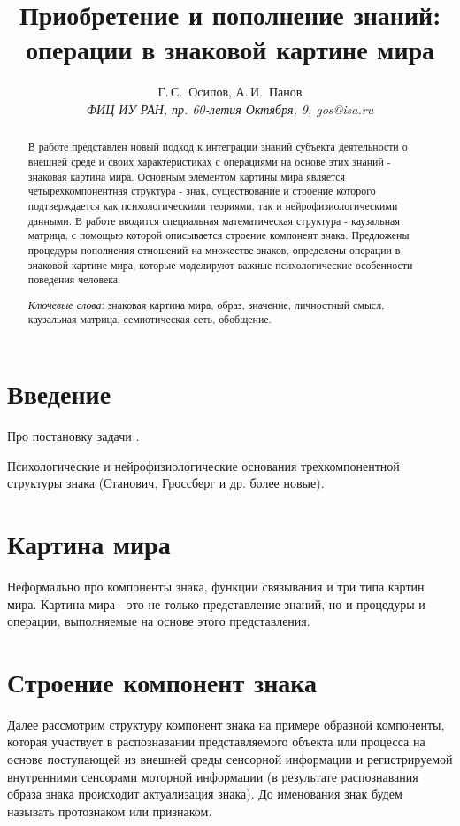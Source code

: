 \documentclass[12pt]{scrartcl}
\title{Приобретение и пополнение знаний: операции в знаковой картине мира}
\author{Г.\,С.~Осипов, А.\,И.~Панов\\
	{\large\slshape ФИЦ ИУ РАН, пр. 60-летия Октября, 9, gos@isa.ru}}
\begin{document}
	
	\maketitle{}
	\begin{abstract}
		В работе представлен новый подход к интеграции знаний субъекта деятельности о внешней среде и своих характеристиках с операциями на основе этих знаний - знаковая картина мира. Основным элементом картины мира является четырехкомпонентная структура - знак, существование и строение которого подтверждается как психологическими теориями, так и нейрофизиологическими данными. В работе вводится специальная математическая структура - каузальная матрица, с помощью которой описывается строение компонент знака. Предложены процедуры пополнения отношений на множестве знаков, определены операции в знаковой картине мира, которые моделируют важные психологические особенности поведения человека.
		\par\bigskip
		\textit{Ключевые слова}: знаковая картина мира, образ, значение, личностный смысл, каузальная матрица, семиотическая сеть, обобщение.
	\end{abstract}
	
	
	
	\section*{Введение}
	Про постановку задачи \cite{Osipov2014c,Osipov2015d}.
	
	Психологические и нейрофизиологические основания трехкомпонентной структуры знака (Станович, Гроссберг и др. более новые).
	
	\section{Картина мира}

	Неформально про компоненты знака, функции связывания и три типа картин мира. Картина мира - это не только представление знаний, но и процедуры и операции, выполняемые на основе этого представления.
	
	\section{Строение компонент знака}
	
	Далее рассмотрим структуру компонент знака на примере образной компоненты, которая участвует в распознавании представляемого объекта или процесса на основе поступающей из внешней среды сенсорной информации и регистрируемой внутренними сенсорами моторной информации (в результате распознавания образа знака происходит актуализация знака). До именования знак будем называть протознаком или признаком.
	
\end{document}
